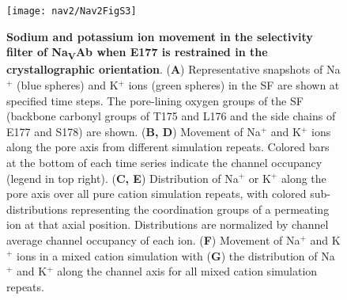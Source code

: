 \begin{refsection}
\begin{figure}[!ptb]
\centering
\texttt{[image: nav2/Nav2FigS3]}
\caption[Sodium and potassium ion movement in the selectivity filter of Na\textsubscript{V}Ab when E177 is restrained in the crystallographic orientation]{\textbf{Sodium and potassium ion movement in the selectivity filter of Na\textsubscript{V}Ab when E177 is restrained in the crystallographic orientation}. (\textbf{A}) Representative snapshots of Na$^+$ (blue spheres) and K$^+$ ions (green spheres) in the SF are shown at specified time steps. The pore-lining oxygen groups of the SF (backbone carbonyl groups of T175 and L176 and the side chains of E177 and S178) are shown. (\textbf{B, D}) Movement of Na$^+$ and K$^+$ ions along the pore axis from different simulation repeats. Colored bars at the bottom of each time series indicate the channel occupancy (legend in top right). (\textbf{C, E}) Distribution of Na$^+$ or K$^+$ along the pore axis over all pure cation simulation repeats, with colored sub-distributions representing the coordination groups of a permeating ion at that axial position. Distributions are normalized by channel average channel occupancy of each ion. (\textbf{F}) Movement of Na$^+$ and K$^+$ ions in a mixed cation simulation with (\textbf{G}) the distribution of Na$^+$ and K$^+$ along the channel axis for all mixed cation simulation repeats.}
\label{fig:nav2figS3}
\end{figure}


\end{refsection}
